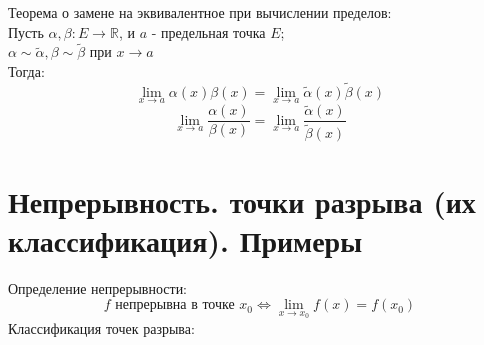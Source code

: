 \documentclass[11pt, a4paper]{article}
\def\R{\mathbb{R}}
\begin{document}
    Теорема о замене на эквивалентное при вычислении пределов:\\
    Пусть $\alpha , \beta : E \to \R$, и $a$ - предельная точка $E$;\\
    $\alpha \sim \tilde{\alpha}, \beta \sim \tilde{\beta}$ при $x \to a$\\
    Тогда:
    $$\lim_{x \to a} \alpha (x) \beta (x) = \lim_{x \to a} \tilde{\alpha} (x) \tilde{\beta} (x)$$
    $$\lim_{x \to a} \frac{\alpha (x)}{\beta (x)} = \lim_{x \to a} \frac{\tilde{\alpha} (x)}{\tilde{\beta} (x)}$$

    \section{Непрерывность. точки разрыва (их классификация). Примеры}
    Определение непрерывности:
    $$f \text{ непрерывна в точке } x_0 \iff \lim_{x \to x_0} f(x) = f(x_0)$$
    Классификация точек разрыва:
\end{document}

